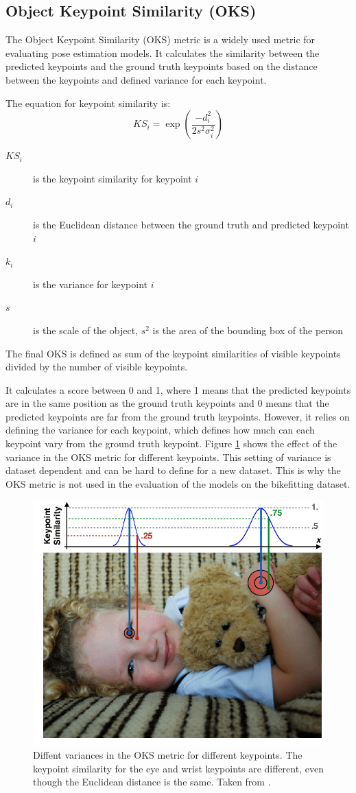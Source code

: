 \subsection{Object Keypoint Similarity (OKS)}
The Object Keypoint Similarity (OKS) metric is a widely used metric for evaluating pose estimation models. It calculates the similarity between the predicted keypoints and the ground truth keypoints based on the distance between the keypoints and defined variance for each keypoint.

The equation for keypoint similarity is:
$$KS_i = \exp\left(\frac{-d^2_i}{2s^2\sigma^2_i}\right)$$

\begin{description}
    \item[$KS_i$] is the keypoint similarity for keypoint $i$
    \item[$d_i$] is the Euclidean distance between the ground truth and predicted keypoint $i$
    \item[$k_i$] is the variance for keypoint $i$
    \item[$s$] is the scale of the object, $s^2$ is the area of the bounding box of the person
\end{description}

The final OKS is defined as sum of the keypoint similarities of visible keypoints divided by the number of visible keypoints.

It calculates a score between 0 and 1, where 1 means that the predicted keypoints are in the same position as the ground truth keypoints and 0 means that the predicted keypoints are far from the ground truth keypoints. However, it relies on defining the variance for each keypoint, which defines how much can each keypoint vary from the ground truth keypoint. Figure \ref{fig:oks} shows the effect of the variance in the OKS metric for different keypoints. This setting of variance is dataset dependent and can be hard to define for a new dataset. This is why the OKS metric is not used in the evaluation of the models on the bikefitting dataset.

\begin{figure}[htbp]
    \centering
    \includegraphics[width=0.7\linewidth]{obrazky-figures/oks.png}
    \caption{Diffent variances in the OKS metric for different keypoints. The keypoint similarity for the eye and wrist keypoints are different, even though the Euclidean distance is the same. Taken from \cite{oks}.}
    \label{fig:oks}
\end{figure}

